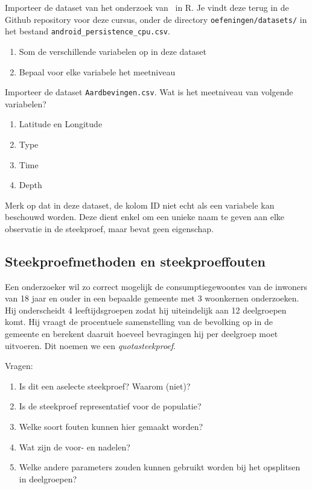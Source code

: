 \begin{exercise}
  Importeer de dataset van het onderzoek van~\textcite{Akin2016} in R. Je vindt deze terug in de Github repository voor deze cursus, onder de directory \texttt{oefeningen/datasets/} in het bestand \texttt{android\_persistence\_cpu.csv}.
  
  \begin{enumerate}
    \item Som de verschillende variabelen op in deze dataset
    \item Bepaal voor elke variabele het meetniveau
  \end{enumerate}
\end{exercise}

\begin{exercise}
  Importeer de dataset \texttt{Aardbevingen.csv}. Wat is het meetniveau van volgende variabelen?
  
  \begin{enumerate}
    \item Latitude en Longitude
    \item Type
    \item Time
    \item Depth
  \end{enumerate}

  Merk op dat in deze dataset, de kolom ID niet echt als een variabele kan beschouwd worden. Deze dient enkel om een unieke naam te geven aan elke observatie in de steekproef, maar bevat geen eigenschap.
\end{exercise}

\subsection{Steekproefmethoden en steekproeffouten}

\begin{exercise}
  Een onderzoeker wil zo correct mogelijk de consumptiegewoontes van de inwoners van 18 jaar en ouder in een bepaalde gemeente met 3 woonkernen onderzoeken.  Hij onderscheidt 4 leeftijdsgroepen zodat hij uiteindelijk aan 12 deelgroepen komt. Hij vraagt de procentuele samenstelling van de bevolking op in de gemeente en berekent daaruit hoeveel bevragingen hij per deelgroep moet uitvoeren. Dit noemen we een \emph{quotasteekproef}.
  
  Vragen:
  \begin{enumerate}[label=\alph*.]
    \item Is dit een aselecte steekproef? Waarom (niet)?
    \item Is de steekproef representatief voor de populatie?
    \item Welke soort fouten kunnen hier gemaakt worden?
    \item Wat zijn de voor- en nadelen?
    \item Welke andere parameters zouden kunnen gebruikt worden bij het opsplitsen in deelgroepen?
  \end{enumerate}
\end{exercise}

